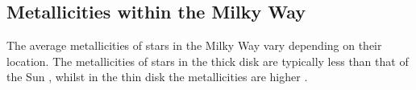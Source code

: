 \documentclass[a4paper,twocolumn,12pt]{article}
\begin{document}






\subsection{Metallicities within the Milky Way}
\label{subsection: Metallicities within the Milky Way}
The average metallicities of stars in the Milky Way vary depending on their location. The metallicities of stars in the thick disk are typically less than that of the Sun \cite{ThickDisc}, whilst in the thin disk the metallicities are higher \cite{ThinAndThickDiskKinematics}.
\end{document}
